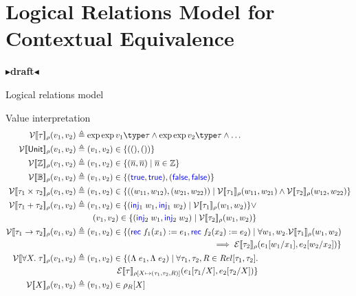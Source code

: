 \documentclass[twoside,11pt,openright]{report}
\theoremstyle{definition}
\newcommand{\Keyword}[1]{{\color{blue} \mathsf{#1}}}
\newcommand{\var}{x}
\newcommand{\expr}{e}
\newcommand{\val}{v}
\newcommand{\valB}{w}
\newcommand{\TT}{()}
\newcommand{\Num}[1]{\overline{#1}}
\newcommand{\True}{\Keyword{true}}
\newcommand{\False}{\Keyword{false}}
\newcommand{\Inj}[1]{\Keyword{inj}_{#1}\;}
\newcommand{\Tvar}{X}
\newcommand{\Tlam}{\Lambda\;}
\newcommand{\subst}[3]{#1{\left[#3 \middle/ #2 \right]}}
\newcommand{\Tunit}{\mathsf{Unit}}
\newcommand{\Tint}{\mathbb{Z}}
\newcommand{\Tbool}{\mathbb{B}}
\newcommand{\Tprod}[2]{#1 \times #2}
\newcommand{\Tsum}[2]{#1 + #2}
\newcommand{\Tfunc}[2]{#1 \rightarrow #2}
\newcommand{\Tall}[2]{\forall #1.\; #2}
\newcommand{\typ}{\tau}
\newcommand{\empvenv}{\bullet}
\newcommand{\emptenv}{\bullet}
\def\envs#1#2\exp#3\type#4{#1 \; | \; #2 \; \vdash #3 : #4}
\newcommand{\ValInp}[2]{\mathcal{V} \llbracket #1 \rrbracket_{#2}}
\newcommand{\ValInpGen}[2]{\ValInp{#1}{#2}(\val_1, \val_2)}
\newcommand{\ExpInp}[2]{\mathcal{E} \llbracket #1 \rrbracket_{#2}}
\newcommand{\map}[2]{#1 \mapsto #2}
\newcommand{\todo}[1]{{\color[rgb]{.5,0,0}\textbf{$\blacktriangleright$#1$\blacktriangleleft$}}}
\begin{document}

\chapter{Logical Relations Model for Contextual Equivalence}
\label{ch:LR}

\todo{draft}

Logical relations model

Value interpretation
\begin{align*}
  \ValInpGen{\typ}{\rho}    &\triangleq \envs \emptenv \empvenv \exp \val_1 \type \typ \land \envs \emptenv \empvenv \exp \val_2 \type \typ \land \dots\\
  \ValInpGen{\Tunit}{\rho}  &\triangleq (\val_1, \val_2) \in \{(\TT, \TT)\}\\
  \ValInpGen{\Tint}{\rho}   &\triangleq (\val_1, \val_2) \in \{(\Num{n}, \Num{n}) \mid \Num{n} \in \Tint\}\\
  \ValInpGen{\Tbool}{\rho}  &\triangleq (\val_1, \val_2) \in \{(\True, \True), (\False, \False)\}\\
  \ValInpGen{\Tprod{\typ_1}{\typ_2}}{\rho}  &\triangleq (\val_1, \val_2) \in \{((\valB_{11}, \valB_{12}), (\valB_{21}, \valB_{22})) \mid \ValInp{\typ_1}{\rho}(\valB_{11}, \valB_{21}) \land \ValInp{\typ_2}{\rho}(\valB_{12}, \valB_{22})\}\\
  \ValInpGen{\Tsum{\typ_1}{\typ_2}}{\rho}   &\triangleq 
  \begin{aligned}[t]
    (\val_1, \val_2) \in \{(\Inj{1} \valB_1, \Inj{1} \valB_2) \mid \ValInp{\typ_1}{\rho}(\valB_1, \valB_2)\} \lor \\
    (\val_1, \val_2) \in \{(\Inj{2} \valB_1, \Inj{2} \valB_2) \mid \ValInp{\typ_2}{\rho}(\valB_1, \valB_2)\}
  \end{aligned}\\
  \ValInpGen{\Tfunc{\typ_1}{\typ_2}}{\rho}  &\triangleq 
  \begin{aligned}[t]
    (\val_1, \val_2) \in \{(\Rec f_1 \var_1 := \expr_1, \Rec f_2 \var_2 := \expr_2) \mid \forall \valB_1, \valB_2 . \ValInp{\typ_1}{\rho}(\valB_{1}, \valB_{2})\\
    \implies \ExpInp{\typ_2}{\rho}(\subst{\expr_1}{\var_1}{\valB_1}, \subst{\expr_2}{\var_2}{\valB_2})\}
  \end{aligned}\\
  \ValInpGen{\Tall{\Tvar}{\typ}}{\rho}  &\triangleq 
  \begin{aligned}[t]
    (\val_1, \val_2) \in \{(\Tlam \expr_1, \Tlam \expr_2) \mid \forall \typ_1, \typ_2, R \in Rel[\typ_1, \typ_2] .\\
    \ExpInp{\typ}{\rho[\map{\Tvar}{(\typ_1, \typ_2, R)}]}(\subst{\expr_1}{\Tvar}{\typ_1}, \subst{\expr_2}{\Tvar}{\typ_2})\}
  \end{aligned}\\
  \ValInpGen{\Tvar}{\rho} &\triangleq (\val_1, \val_2) \in \rho_R[\Tvar]\\
\end{align*}
\end{document}
